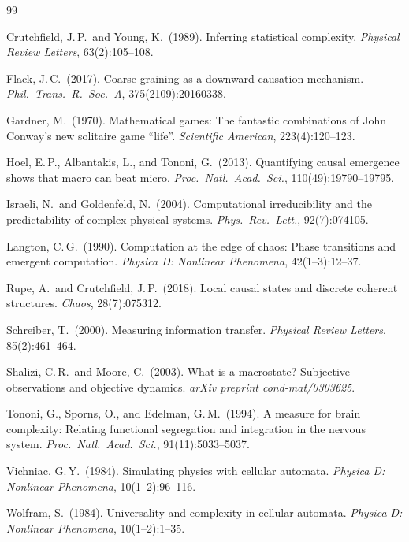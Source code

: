 \documentclass[aip,cha,preprint,nofootinbib]{revtex4-2}
\begin{document}
\begin{thebibliography}{99}

Crutchfield, J.\,P.\ and Young, K.\ (1989).
Inferring statistical complexity.
\textit{Physical Review Letters}, 63(2):105--108.

Flack, J.\,C.\ (2017).
Coarse-graining as a downward causation mechanism.
\textit{Phil.\ Trans.\ R.\ Soc.\ A}, 375(2109):20160338.

Gardner, M.\ (1970).
Mathematical games: The fantastic combinations of John Conway's new
solitaire game ``life''.
\textit{Scientific American}, 223(4):120--123.

Hoel, E.\,P., Albantakis, L., and Tononi, G.\ (2013).
Quantifying causal emergence shows that macro can beat micro.
\textit{Proc.\ Natl.\ Acad.\ Sci.}, 110(49):19790--19795.

Israeli, N.\ and Goldenfeld, N.\ (2004).
Computational irreducibility and the predictability of complex physical
systems.
\textit{Phys.\ Rev.\ Lett.}, 92(7):074105.

Langton, C.\,G.\ (1990).
Computation at the edge of chaos: Phase transitions and emergent computation.
\textit{Physica D: Nonlinear Phenomena}, 42(1--3):12--37.

Rupe, A.\ and Crutchfield, J.\,P.\ (2018).
Local causal states and discrete coherent structures.
\textit{Chaos}, 28(7):075312.

Schreiber, T.\ (2000).
Measuring information transfer.
\textit{Physical Review Letters}, 85(2):461--464.

Shalizi, C.\,R.\ and Moore, C.\ (2003).
What is a macrostate? Subjective observations and objective dynamics.
\textit{arXiv preprint cond-mat/0303625}.

Tononi, G., Sporns, O., and Edelman, G.\,M.\ (1994).
A measure for brain complexity: Relating functional segregation and
integration in the nervous system.
\textit{Proc.\ Natl.\ Acad.\ Sci.}, 91(11):5033--5037.

Vichniac, G.\,Y.\ (1984).
Simulating physics with cellular automata.
\textit{Physica D: Nonlinear Phenomena}, 10(1--2):96--116.

Wolfram, S.\ (1984).
Universality and complexity in cellular automata.
\textit{Physica D: Nonlinear Phenomena}, 10(1--2):1--35.

\end{thebibliography}
\end{document}
